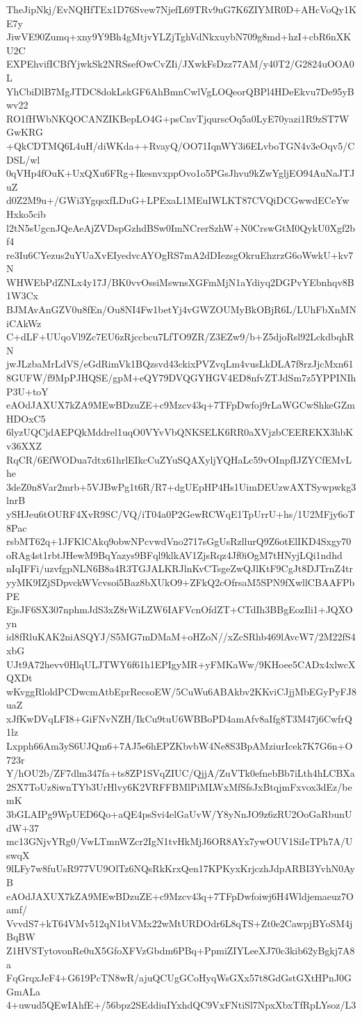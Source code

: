 TheJipNkj/EvNQHfTEx1D76Svew7NjefL69TRv9uG7K6ZIYMR0D+AHcVoQy1KE7y
JiwVE90Zumq+xny9Y9Bh4gMtjvYLZjTghVdNkxuybN709g8md+hzI+cbR6nXKU2C
EXPEhvifICBfYjwkSk2NRSsefOwCvZIi/JXwkFsDzz77AM/y40T2/G2824uOOA0L
YhCbiDlB7MgJTDC8dokLskGF6AhBmnCwlVgLOQeorQBPl4HDeEkvu7De95yBwv22
RO1fHWbNKQOCANZIKBepLO4G+psCnvTjqurscOq5a0LyE70yazi1R9zST7WGwKRG
+QkCDTMQ6L4uH/diWKda++RvayQ/OO71IqnWY3i6ELvboTGN4v3eOqv5/CDSL/wl
0qVHp4fOuK+UxQXu6FRg+IkesnvxppOvo1o5PGsJhvu9kZwYgljEO94AuNaJTJuZ
d0Z2M9u+/GWi3YgqsxfLDuG+LPExaL1MEuIWLKT87CVQiDCGwwdECeYwHxko5cib
l2tN5sUgcnJQeAeAjZVDspGzhdBSw0ImNCrerSzhW+N0CrswGtM0QykU0Xgf2bf4
re3Iu6CYezus2uYUaXvEIyedvcAYOgRS7mA2dDIezsgOkruEhzrzG6oWwkU+kv7N
WHWEbPdZNLx4y17J/BK0vvOssiMswnsXGFmMjN1aYdiyq2DGPvYEbnhqv8B1W3Cx
BJMAvAnGZV0u8fEn/Ou8NI4Fw1betYj4vGWZOUMyBkOBjR6L/LUhFbXnMNiCAkWz
C+dLF+UUqoVl9Zc7EU6zRjccbcu7LfTO9ZR/Z3EZw9/b+Z5djoRsl92LckdbqhRN
jwJLzbaMrLdVS/eGdRimVk1BQzsvd43ckixPVZvqLm4vusLkDLA7f8rzJjcMxn61
8GUFW/f9MpPJHQSE/gpM+eQY79DVQGYHGV4ED8nfvZTJdSm7z5YPPINIhP3U+toY
eAOdJAXUX7kZA9MEwBDzuZE+c9Mzcv43q+7TFpDwfoj9rLaWGCwShkeGZmHDOxC5
6lyzUQCjdAEPQkMddrel1uqO0VYvVbQNKSELK6RR0aXVjzbCEEREKX3hbKv36XXZ
RqCR/6EfWODua7dtx61hrlEIkcCuZYuSQAXyljYQHaLc59vOInpfIJZYCfEMvLhe
3deZ0n8Var2mrb+5VJBwPg1t6R/R7+dgUEpHP4Hs1UimDEUzwAXTSywpwkg3lnrB
ySHJeu6tOURF4XvR9SC/VQ/iT04a0P2GewRCWqE1TpUrrU+hs/1U2MFjy6oT8Pac
rsbMT62q+1JFKlCAkq9obwNPcvwdVno2717sGgUsRzllurQ9Z6otElIKD4Sxgy70
oRAg4st1rbtJHewM9BqYazys9BFql9klkAV1ZjsRqz4Jf0iOgM7tHNyjLQi1ndhd
nIqIFFi/uzvfgpNLN6B8a4R3TGJALKRJlnKvCTsgeZwQJlKtF9CgJt8DJTrnZ4tr
yyMK9IZjSDpvckWVcvsoi5Baz8bXUkO9+ZFkQ2cOfrsaM5SPN9fXwllCBAAFPbPE
EjsJF6SX307nphmJdS3xZ8rWiLZW6IAFVcnOfdZT+CTdIh3BBgEozIli1+JQXOyn
id8fRluKAK2niASQYJ/S5MG7mDMaM+oHZoN//xZcSRhb469lAvcW7/2M22fS4xbG
UJt9A72hevv0HlqULJTWY6f61h1EPIgyMR+yFMKaWw/9KHoee5CADx4xlwcXQXDt
wKvggRloldPCDwcmAtbEprRecsoEW/5CuWu6ABAkbv2KKviCJjjMbEGyPyFJ8uaZ
xJfKwDVqLFI8+GiFNvNZH/IkCu9tuU6WBBoPD4amAfv8aIfg8T3M47j6CwfrQ1lz
Lxpph66Am3yS6UJQm6+7AJ5e6hEPZKbvbW4Ne8S3BpAMziurIcek7K7G6n+O723r
Y/hOU2b/ZF7dlm347fa+ts8ZP1SVqZIUC/QjjA/ZuVTk0efnebBb7iLth4hLCBXa
2SX7ToUz8iwnTYb3UrHlvy6K2VRFFBMlPiMLWxMfSfsJxBtqjmFxvox3dEz/bemK
3bGLAIPg9WpUED6Qo+aQE4psSvi4elGaUvW/Y8yNnJO9z6zRU2OoGaRbunUdW+37
mc13GNjvYRg0/VwLTmnWZcr2IgN1tvHkMjJ6OR8AYx7ywOUV1SiIeTPh7A/UswqX
9lLFy7w8fuUsR977VU9OlTz6NQsRkKrxQen17KPKyxKrjczhJdpARBI3YvhN0AyB
eAOdJAXUX7kZA9MEwBDzuZE+c9Mzcv43q+7TFpDwfoiwj6H4Wldjemaeuz7Oamf/
VvvdS7+kT64VMv512qN1btVMx22wMtURDOdr6L8qTS+Zt0e2CawpjBYoSM4jBqBW
Z1HVSTytovonRe0uX5GfoXFVzGbdm6PBq+PpmiZIYLeeXJ70c3kib62yBgkj7A8a
FqGrqxJeF4+G619PcTN8wR/ajuQCUgGCoHyqWsGXx57t8GdGstGXtHPnJ0GGmALa
4+uwud5QEwIAhfE+/56bpz2SEddiuIYxhdQC9VxFNtiSl7NpxXbxTfRpLYsoz/L3

